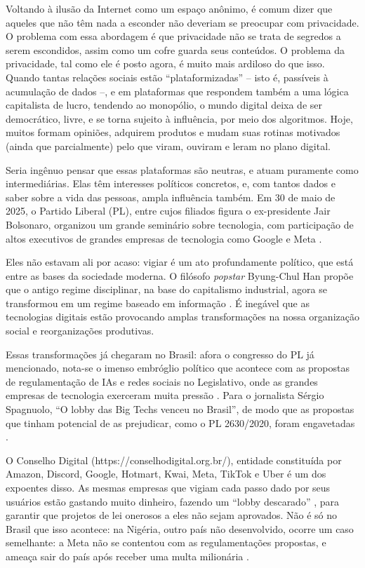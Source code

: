 Voltando à ilusão da Internet como um espaço anônimo, é comum dizer que aqueles que não têm nada a esconder não deveriam se preocupar com privacidade.
O problema com essa abordagem é que privacidade não se trata de segredos a serem escondidos, assim como um cofre guarda seus conteúdos.
O problema da privacidade, tal como ele é posto agora, é muito mais ardiloso do que isso.
Quando tantas relações sociais estão ``plataformizadas'' -- isto é, passíveis à acumulação de dados --, e em plataformas que respondem também a uma lógica capitalista de lucro, tendendo ao monopólio, o mundo digital deixa de ser democrático, livre, e se torna sujeito à influência, por meio dos algoritmos.
Hoje, muitos formam opiniões, adquirem produtos e mudam suas rotinas motivados (ainda que parcialmente) pelo que viram, ouviram e leram no plano digital.

Seria ingênuo pensar que essas plataformas são neutras, e atuam puramente como intermediárias.
Elas têm interesses políticos concretos, e, com tantos dados e saber sobre a vida das pessoas, ampla influência também.
Em 30 de maio de 2025, o Partido Liberal (PL), entre cujos filiados figura o ex-presidente Jair Bolsonaro, organizou um grande seminário sobre tecnologia, com participação de altos executivos de grandes empresas de tecnologia como Google e Meta \cite{desouza_treinamento_2025}.

Eles não estavam ali por acaso: vigiar é um ato profundamente político, que está entre as bases da sociedade moderna. 
O filósofo \textit{popstar} Byung-Chul Han propõe que o antigo regime disciplinar, na base do capitalismo industrial, agora se transformou em um regime baseado em informação \cite{han_infocracia_2022}.
É inegável que as tecnologias digitais estão provocando amplas transformações na nossa organização social e reorganizações produtivas.

Essas transformações já chegaram no Brasil: afora o congresso do PL já mencionado, nota-se o imenso embróglio político que acontece com as propostas de regulamentação de IAs e redes sociais no Legislativo, onde as grandes empresas de tecnologia exerceram muita pressão \cite{schurig_como_2024, schurig_quem_2024}.
Para o jornalista Sérgio Spagnuolo, ``O lobby das Big Techs venceu no Brasil'', de modo que as propostas que tinham potencial de as prejudicar, como o PL 2630/2020, foram engavetadas \cite{spagnuolo_lobby_2024}.

O Conselho Digital (https://conselhodigital.org.br/), entidade constituída por Amazon, Discord, Google, Hotmart, Kwai, Meta, TikTok e Uber é um dos expoentes disso.
As mesmas empresas que vigiam cada passo dado por seus usuários estão gastando muito dinheiro, fazendo um ``lobby descarado'' \cite{detoledo_pl_2023}, para garantir que projetos de lei onerosos a eles não sejam aprovados.
Não é só no Brasil que isso acontece: na Nigéria, outro país não desenvolvido, ocorre um caso semelhante: a Meta não se contentou com as regulamentações propostas, e ameaça sair do país após receber uma multa milionária \cite{asadu_nigeria_2024}.

